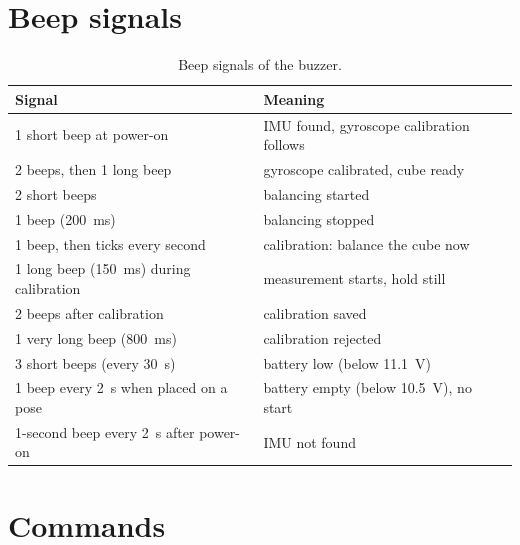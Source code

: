 \section{Beep signals}

\begin{table}[htbp]
  \centering
  \caption{Beep signals of the buzzer.}
  \label{tab:beeps}
  \begin{tabularx}{\textwidth}{lX}
    \toprule
    Signal & Meaning \\
    \midrule
    1 short beep at power-on & IMU found, gyroscope calibration follows \\
    2 beeps, then 1 long beep & gyroscope calibrated, cube ready \\
    2 short beeps & balancing started \\
    1 beep (\SI{200}{ms}) & balancing stopped \\
    1 beep, then ticks every second & calibration: balance the cube now \\
    1 long beep (\SI{150}{ms}) during calibration & measurement starts, hold still \\
    2 beeps after calibration & calibration saved \\
    1 very long beep (\SI{800}{ms}) & calibration rejected \\
    3 short beeps (every \SI{30}{s}) & battery low (below \SI{11.1}{V}) \\
    1 beep every \SI{2}{s} when placed on a pose & battery empty (below \SI{10.5}{V}), no start \\
    1-second beep every \SI{2}{s} after power-on & IMU not found \\
    \bottomrule
  \end{tabularx}
\end{table}

\section{Commands}
\label{sec:commands}

